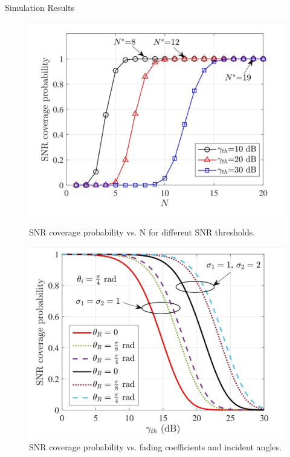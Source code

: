 \documentclass{beamer}
\begin{document}
\begin{frame}{Simulation Results}
    \begin{figure}
        \centering
        \includegraphics[scale = 0.12]{figures/SNR_cov_prob_vs_N.jpg}
        \caption{SNR coverage probability vs. N for different SNR thresholds.}
        \includegraphics[scale = 0.125]{figures/SNR_vs_fadingCoeff_incidentAngle.jpg}
        \caption{SNR coverage probability vs. fading coefficients and incident angles.}
    \end{figure}
\end{frame}
\end{document}
